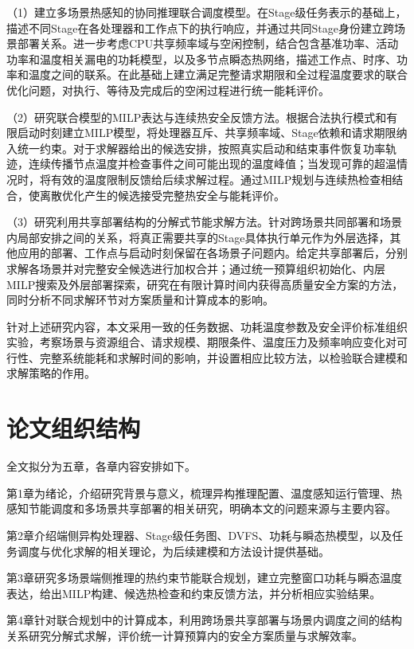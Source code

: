 （1）建立多场景热感知的协同推理联合调度模型。在Stage级任务表示的基础上，描述不同Stage在各处理器和工作点下的执行响应，并通过共同Stage身份建立跨场景部署关系。进一步考虑CPU共享频率域与空闲控制，结合包含基准功率、活动功率和温度相关漏电的功耗模型，以及多节点瞬态热网络，描述工作点、时序、功率和温度之间的联系。在此基础上建立满足完整请求期限和全过程温度要求的联合优化问题，对执行、等待及完成后的空闲过程进行统一能耗评价。

（2）研究联合模型的MILP表达与连续热安全反馈方法。根据合法执行模式和有限启动时刻建立MILP模型，将处理器互斥、共享频率域、Stage依赖和请求期限纳入统一约束。对于求解器给出的候选安排，按照真实启动和结束事件恢复功率轨迹，连续传播节点温度并检查事件之间可能出现的温度峰值；当发现可靠的超温情况时，将有效的温度限制反馈给后续求解过程。通过MILP规划与连续热检查相结合，使离散优化产生的候选接受完整热安全与能耗评价。

（3）研究利用共享部署结构的分解式节能求解方法。针对跨场景共同部署和场景内局部安排之间的关系，将真正需要共享的Stage具体执行单元作为外层选择，其他应用的部署、工作点与启动时刻保留在各场景子问题内。给定共享部署后，分别求解各场景并对完整安全候选进行加权合并；通过统一预算组织初始化、内层MILP搜索及外层部署探索，研究在有限计算时间内获得高质量安全方案的方法，同时分析不同求解环节对方案质量和计算成本的影响。

针对上述研究内容，本文采用一致的任务数据、功耗温度参数及安全评价标准组织实验，考察场景与资源组合、请求规模、期限条件、温度压力及频率响应变化对可行性、完整系统能耗和求解时间的影响，并设置相应比较方法，以检验联合建模和求解策略的作用。

\section{论文组织结构}\label{ux8bbaux6587ux7ec4ux7ec7ux7ed3ux6784}

全文拟分为五章，各章内容安排如下。

第1章为绪论，介绍研究背景与意义，梳理异构推理配置、温度感知运行管理、热感知节能调度和多场景共享部署的相关研究，明确本文的问题来源与主要内容。

第2章介绍端侧异构处理器、Stage级任务图、DVFS、功耗与瞬态热模型，以及任务调度与优化求解的相关理论，为后续建模和方法设计提供基础。

第3章研究多场景端侧推理的热约束节能联合规划，建立完整窗口功耗与瞬态温度表达，给出MILP构建、候选热检查和约束反馈方法，并分析相应实验结果。

第4章针对联合规划中的计算成本，利用跨场景共享部署与场景内调度之间的结构关系研究分解式求解，评价统一计算预算内的安全方案质量与求解效率。

